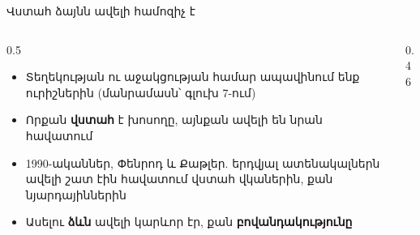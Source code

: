 \begin{frame}{Վստահ ձայնն ավելի համոզիչ է}
  \begin{columns}[c]
    \begin{column}{0.5\textwidth}
      \begin{itemize}
        \item Տեղեկության ու աջակցության համար ապավինում ենք ուրիշներին (մանրամասն՝ գլուխ 7-ում)
        \item<2-> Որքան \textbf{վստահ} է խոսողը, այնքան ավելի են նրան հավատում
        \item<3-> 1990-ականներ, Փենրոդ և Քաթլեր. երդվյալ ատենակալներն ավելի շատ էին հավատում վստահ վկաներին, քան նյարդայիններին
        \item<4-> Ասելու \textbf{ձևն} ավելի կարևոր էր, քան \textbf{բովանդակությունը}
      \end{itemize}
    \end{column}
    \begin{column}{0.46\textwidth}
      \centering
    \end{column}
  \end{columns}
\end{frame}

